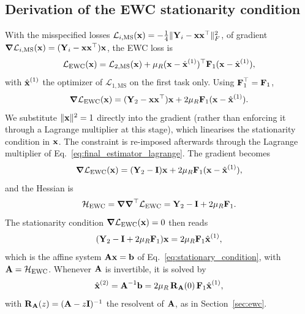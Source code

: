 \subsection{Derivation of the EWC stationarity condition}\label{adix:ewc}
With the misspecified losses $\mathcal{L}_{i,\mathrm{MS}}(\vect{x}) = -\tfrac{1}{4} \|\vect Y_i - \vect{x}\vect{x}^\top\|_F^2$, of gradient $\vect \nabla \mathcal{L}_{i,\mathrm{MS}}(\vect{x}) = (\vect Y_i - \vect{x}\vect{x}^\top) \vect{x}$, the EWC loss is
\[
    \mathcal L_{\mathrm{EWC}}(\vect{x}) = \mathcal{L}_{2,\mathrm{MS}}(\vect{x}) +
    \mu_R (\vect{x} - \hat{\vect{x}}^{(1)})^\top \vect F_1(\vect{x} - \hat{\vect{x}}^{(1)}),
\]
with $\hat{\vect{x}}^{(1)}$ the optimizer of $\mathcal{L}_{1,\mathrm{MS}}$ on the first task only. Using $\vect F_1^\top=\vect F_1$,
\[
    \vect \nabla \mathcal L_{\mathrm{EWC}}(\vect{x})= (\vect Y_2 - \vect{x} \vect{x}^\top) \vect{x}+2\mu_R \vect F_1(\vect{x} - \hat{\vect x}^{(1)}) .
\]
We substitute $\|\vect{x}\|^2 = 1$ directly into the gradient (rather than enforcing it through a Lagrange multiplier at this stage), which linearises the stationarity condition in $\vect{x}$. The constraint is re-imposed afterwards through the Lagrange multiplier of Eq.~\eqref{eq:final_estimator_lagrange}. The gradient becomes
\[
 \vect \nabla \mathcal L_{\mathrm{EWC}}(\vect{x})= (\vect Y_2 - \vect I) \vect{x}+2\mu_R \vect F_1(\vect{x} - \hat{\vect x}^{(1)}),
\]
and the Hessian is
\[
    \mathcal{H}_{\mathrm{EWC}} = \vect \nabla \vect \nabla ^\top \mathcal{L}_{\mathrm{EWC}} = \vect Y_2 - \vect I  + 2 \mu_R \vect F_1 .
\]
The stationarity condition $\vect \nabla \mathcal L_{\mathrm{EWC}}(\vect{x})= 0$ then reads
\[
(\vect Y_2 - \vect I + 2 \mu_R \vect F_1) \vect{x}=2 \mu_R\vect F_1\hat{\vect x}^{(1)},
\]
which is the affine system $\vect A \vect{x} = \vect b$ of Eq.~\eqref{eq:stationary_condition}, with $\vect A = \mathcal{H}_{\mathrm{EWC}}$. Whenever $\vect A$ is invertible, it is solved by
\[
    \hat{\vect{x}}^{(2)} = \vect A^{-1}\vect b = 2\mu_R\,\vect R_{\vect A}(0)\,\vect F_1 \hat{\vect x}^{(1)},
\]
with $\vect R_{\vect A}(z) = (\vect A - z\vect I)^{-1}$ the resolvent of $\vect A$, as in Section~\ref{sec:ewc}.

